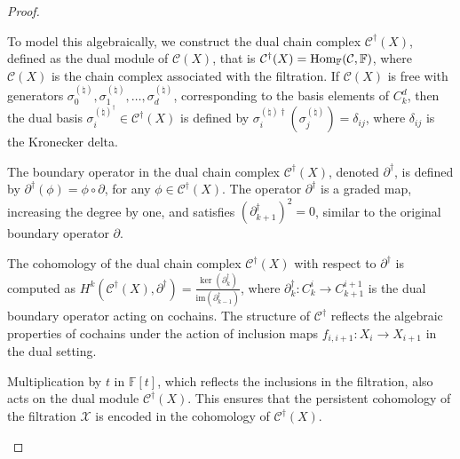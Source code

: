 \begin{proof}
\begin{enumerate}
To model this algebraically, we construct the dual chain complex \( \mathcal{C}^\dagger(X) \), defined as the dual module of \( \mathcal{C}(X) \), that is \( \mathcal{C}^\dagger(X) = \mathrm{Hom}_{\mathbb{F}}(\mathcal{C}, \mathbb{F}) \), where \( \mathcal{C}(X) \) is the chain complex associated with the filtration. If \( \mathcal{C}(X) \) is free with generators \( \sigma^{(\natural)}_0, \sigma^{(\natural)}_1, \ldots, \sigma^{(\natural)}_d \), corresponding to the basis elements of \( C_k^d \), then the dual basis $\sigma^{(\natural)^\dagger}_i \in \mathcal{C}^\dagger(X)$ is defined by \( \sigma^{(\natural)\dagger}_i(\sigma^{(\natural)}_j) = \delta_{ij} \), where \( \delta_{ij} \) is the Kronecker delta.

The boundary operator in the dual chain complex \( \mathcal{C}^\dagger(X) \), denoted \( \partial^\dagger \), is defined by $\partial^\dagger(\phi) = \phi \circ \partial$, for any \( \phi \in \mathcal{C}^\dagger(X) \). The operator \( \partial^\dagger \) is a graded map, increasing the degree by one, and satisfies \( (\partial^\dagger_{k+1})^2 = 0 \), similar to the original boundary operator \( \partial \).

The cohomology of the dual chain complex \( \mathcal{C}^\dagger(X) \) with respect to \( \partial^\dagger \) is computed as $H^k(\mathcal{C}^\dagger(X), \partial^\dagger) = \frac{\ker(\partial^\dagger_k)}{\mathrm{im}(\partial^\dagger_{k-1})}$, where \( \partial^\dagger_k: C_k^i \to C_{k+1}^{i+1} \) is the dual boundary operator acting on cochains. The structure of \( \mathcal{C}^\dagger \) reflects the algebraic properties of cochains under the action of inclusion maps \( f_{i,i+1}: X_i \to X_{i+1} \) in the dual setting.

Multiplication by \( t \) in \( \mathbb{F}[t] \), which reflects the inclusions in the filtration, also acts on the dual module \( \mathcal{C}^\dagger(X) \). This ensures that the persistent cohomology of the filtration \( \mathcal{X} \) is encoded in the cohomology of \( \mathcal{C}^\dagger(X) \).


\end{enumerate}
\end{proof}
